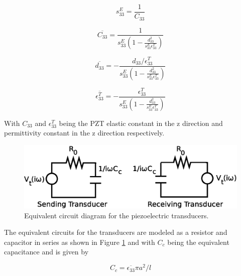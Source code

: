 \begin{equation}
s^E_{33} = \frac{1}{C_{33}}
\end{equation}

\begin{equation}
\overline{C_{33}} = \frac{1}{s^E_{33}(1 - \frac{d^2_{33}}{s^E_{33}\epsilon ^T_{33}})}
\end{equation}

\begin{equation}
\overline{d_{33}} = -\frac{d_{33} / \epsilon ^T_{33}}{s^E_{33}(1 - \frac{d^2_{33}}{s^E_{33}\epsilon ^T_{33}})}
\end{equation}

\begin{equation}
\overline{\epsilon ^T_{33}} = -\frac{\epsilon ^T_{33}}{s^E_{33}(1 - \frac{d^2_{33}}{s^E_{33}\epsilon ^T_{33}})}
\end{equation}


With $C_{33}$ and $\epsilon ^T_{33}$ being the PZT elastic constant in the z direction and permittivity constant in the z direction respectively.

\begin{figure}[ht!]
\centering
\includegraphics[width=1\textwidth]{eps_pics/trans_circ}
\caption{Equivalent circuit diagram for the piezoelectric transducers.
	 \label{fig:trans_circ}} 
\end{figure}


The equivalent circuits for the transducers are modeled as a resistor and capacitor in series as shown in Figure \ref{fig:trans_circ} and with $C_c$ being the equivalent capacitance and is given by

\begin{equation}
C_c = \overline{\epsilon_{33}} \pi a^2/l
\end{equation}

